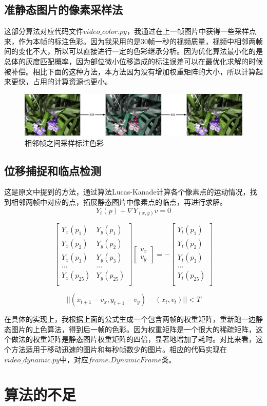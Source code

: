 \documentclass{article}
\begin{document}
\subsection{准静态图片的像素采样法}
这部分算法对应代码文件$video\_color.py$，我通过在上一帧图片中获得一些采样点来，作为本帧的标注色彩。因为我采用的是30帧一秒的视频质量，视频中相邻两帧间的变化不大，所以可以直接进行一定的色彩继承分析。因为优化算法最小化的是总体的灰度匹配概率，因为部位微小位移造成的标注误差可以在最优化求解的时候被补偿。相比下面的这种方法，本方法因为没有增加权重矩阵的大小，所以计算起来更快，占用的计算资源也更小。

\begin{figure}[H]
\centering
\includegraphics[scale=0.3]{seq.pdf}
\caption{相邻帧之间采样标注色彩}
\end{figure}

\subsection{位移捕捉和临点检测}
这是原文中提到的方法，通过算法Lucas-Kanade计算各个像素点的运动情况，找到相邻两帧中对应的点，拓展静态图片中像素点的临点，再进行求解。
\begin{equation}
Y_t(p) +  \nabla Y_{(x, y)} v = 0
\end{equation}

\begin{equation}
\left[
\begin{array}{cc}
Y_x(p_1) & Y_y(p_1)\\
Y_x(p_2) & Y_y(p_2)\\
Y_x(p_3) & Y_y(p_3)\\
\ldots & \ldots \\
Y_x(p_{25}) & Y_y(p_{25})\\
\end{array}
\right]
\left[
\begin{array}{c}
v_x\\
v_y
\end{array}
\right]
= - 
\left[
\begin{array}{c}
Y_t(p_1)\\
Y_t(p_2)\\
Y_t(p_3)\\
\ldots\\
Y_t(p_{25})\\
\end{array}
\right]
\end{equation}

\begin{equation}
||(x_{t+1}-v_x, y_{t+1}-v_y) - (x_t, v_t)||< T
\end{equation}

在具体的实现上，我根据上面的公式生成一个包含两帧的权重矩阵，重新跑一边静态图片的上色算法，得到后一帧的色彩。因为权重矩阵是一个很大的稀疏矩阵，这个做法的权重矩阵是静态图片权重矩阵的四倍，显著地增加了耗时。对比来看，这个方法适用于移动迅速的图片和每秒帧数少的图片。相应的代码实现在$video\_dynamic.py$中，对应$frame.DynamicFrame$类。

\section{算法的不足}
\end{document}
